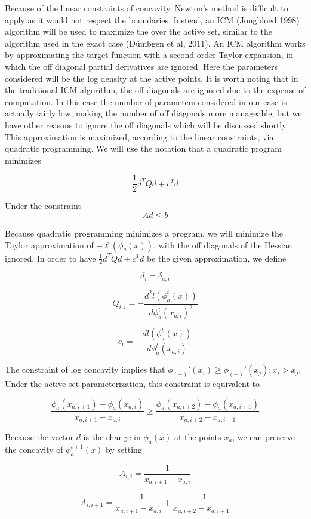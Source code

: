 \documentclass[10pt]{article}
\begin{document}
	Because of the linear constraints of concavity, Newton's method is difficult to apply as it would not respect the boundaries. Instead, an ICM (Jongbloed 1998) algorithm will be used to maximize the over the active set, similar to the algorithm used in the exact case (D\"umbgen et al, 2011). An ICM algorithm works by approximating the target function with a second order Taylor expansion, in which the off diagonal partial derivatives are ignored. Here the parameters considered will be the log density at the active points. It is worth noting that in the traditional ICM algorithm, the off diagonals are ignored due to the expense of computation. In this case the number of parameters considered in our case is actually fairly low, making the number of off diagonals more manageable, but we have other reasons to ignore the off diagonals which will be discussed shortly. This approximation is maximized, according to the linear constraints, via quadratic programming. We will use the notation that a quadratic program minimizes
	
	\[ \frac{1}{2} d^T Q d + c^T d
	\]
	
	Under the constraint \[ A d \leq b\]
	
	Because quadratic programming minimizes a program, we will minimize the Taylor approximation of $-\ell(\phi_a(x))$, with the off diagonals of the Hessian ignored. In order to have $\frac{1}{2} d^T Q d + c^T d$ be the given approximation, we define
	
	\[ d_i = \delta_{a,i}
	\]
	
	\[Q_{i,i} = - \frac{d^2 l({\phi_a^t(x)})} {d {\phi_a^{t}(x_{a,i})}^2}
	\]
	 
	\[c_i = -\frac{d l({\phi_a^t(x)})} {d {\phi_a^{t}(x_{a,i})}} 
	\]
	
	
	The constraint of log concavity implies that $\phi_{(-)}'(x_i) \geq \phi_{(-)}'(x_j); x_i > x_j$. Under the active set parameterization, this constraint is equivalent to 
	
	\[ \frac { \phi_a(x_{a,i+1}) - \phi_a(x_{a,i}) } {x_{a,i+1} - x_{a,i} } 	\geq \frac { \phi_a(x_{a,i+2}) - \phi_a(x_{a,i+1}) } {x_{a,i+2} - x_{a,i+1} } 
	\]
	
	Because the vector $d$ is the change in $\phi_a(x)$ at the points $x_a$, we can preserve the concavity of $\phi_a^{t+1}(x)$ by setting 
	
	\[ A_{i,i} = \frac{1}{x_{a,i+1} - x_{a,i} }
	\]
	
	\[ A_{i, i + 1} = \frac{-1}{x_{a,i+1} - x_{a,i} } + \frac{-1}{x_{a,i+2} - x_{a,i + 1} }
	\]
	
\end{document}
